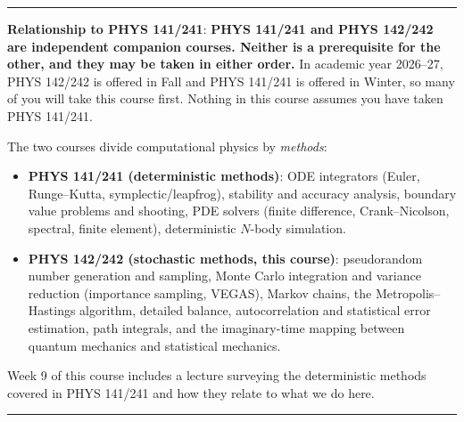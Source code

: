 \documentclass[12pt]{article}
\begin{document}
\begin{center}
  \rule{\textwidth}{0.5pt}
\end{center}

\noindent\textbf{Relationship to PHYS 141/241}: \textbf{PHYS 141/241 and PHYS 142/242 are independent companion courses. Neither is a prerequisite for the other, and they may be taken in either order.}
In academic year 2026--27, PHYS 142/242 is offered in Fall and PHYS 141/241 is offered in Winter, so many of you will take this course first.
Nothing in this course assumes you have taken PHYS 141/241.

The two courses divide computational physics by \emph{methods}:
\begin{itemize}
  \itemsep-0.3em
  \item \textbf{PHYS 141/241 (deterministic methods)}: ODE integrators (Euler, Runge--Kutta, symplectic/leapfrog), stability and accuracy analysis, boundary value problems and shooting, PDE solvers (finite difference, Crank--Nicolson, spectral, finite element), deterministic $N$-body simulation.
  \item \textbf{PHYS 142/242 (stochastic methods, this course)}: pseudorandom number generation and sampling, Monte Carlo integration and variance reduction (importance sampling, VEGAS), Markov chains, the Metropolis--Hastings algorithm, detailed balance, autocorrelation and statistical error estimation, path integrals, and the imaginary-time mapping between quantum mechanics and statistical mechanics.
\end{itemize}
Week 9 of this course includes a lecture surveying the deterministic methods covered in PHYS 141/241 and how they relate to what we do here.

\begin{center}
  \rule{\textwidth}{0.5pt}
\end{center}
\end{document}
